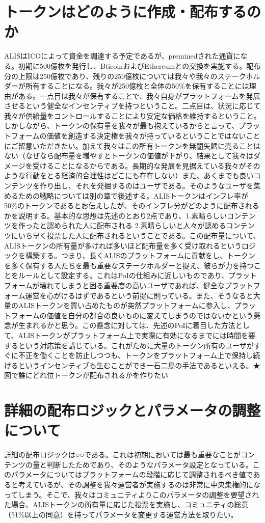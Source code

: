 \documentclass{jsarticle}
\begin{document}
\section{トークンはどのように作成・配布するのか}
ALISはICOによって資金を調達する予定であるが、preminedされた通貨になる。初期に500億枚を発行し、BticoinおよびEthereumとの交換を実施する。配布分の上限は250億枚であり、残りの250億枚については我々や我々のステークホルダーが所有することになる。我々が250億枚と全体の50\%を保有することには理由がある。一点目は我々が保有することで、我々自身がプラットフォームを発展させるという健全なインセンティブを持つということ。二点目は、状況に応じて我々が供給量をコントロールすることにより安定な価格を維持するということ。しかしながら、トークンの保有量を我々が最も抱えているからと言って、プラットフォームの価値を創造する決定権を我々が持っているということではないことにご留意いただきたい。加えて我々はこの所有トークンを無闇矢鱈に売ることはない（なぜなら配布量を増やすとトークンの価値が下がり、結果として我々はダメージを受けることになるからである。長期的な発展を見据えている我々がそのような行動をとる経済的合理性はどこにも存在しない）また、あくまでも良いコンテンツを作り出し、それを発掘するのはユーザである。そのようなユーザを集めるための戦略については別の章で後述する。ALISトークンはインフレ率が50\%のトークンであるとお伝えしたが、そのインフレ分がどのように配布されるかを説明する。基本的な思想は先述のとおり2点であり、1.素晴らしいコンテンツを作ったと認められた人に配布される 2.素晴らしいと人々が認めるコンテンツにいち早く投票した人に配布されるということである。この配布量について、ALISトークンの所有量が多ければ多いほど配布量を多く受け取れるというロジックを構築する。つまり、長くALISのプラットフォームに貢献をし、トークンを多く保有する人たちを最も重要なステークホルダーと捉え、彼らが力を持つことをルールとして設定する。これはPoIの仕組みに近しいものであり、プラットフォームが壊れてしまうと困る重要度の高いユーザであれば、健全なプラットフォーム運営を心がけるはずであるという前提に則っている。また、そうなると大量のALISトークンを買い占めたものが突然プラットフォームに参入し、プラットフォームの価値を自分の都合の良いものに変えてしまうのではないかという懸念が生まれるかと思う。この懸念に対しては、先述のPoIに着目した方法として、ALISトークンがプラットフォーム上で実際に有効になるまでには時間を要するという対応策を講じている。これがために大量のトークン所有のユーザがすぐに不正を働くことを防止しつつも、トークンをプラットフォーム上で保持し続けるというインセンティブも生むことができ一石二鳥の手法であるといえる。★図で誰にどれ位トークンが配布されるかを作りたい
\section{詳細の配布ロジックとパラメータの調整について}
詳細の配布ロジックは○○である。これは初期においては最も重要なことがコンテンツの量と判断したためであり、そのようなパラメータ設定となっている。このパラメータについてはプラットフォームの段階に応じて調整されるべき値であると考えているが、その調整を我々運営者が実施するのは非常に中央集権的になってしまう。そこで、我々はコミュニティよりこのパラメータの調整を要望された場合、ALISトークンの所有量に応じた投票を実施し、コミュニティの総意（51\%以上の同意）を持ってパラメータを変更する運営方法を取りたい。
\end{document}
